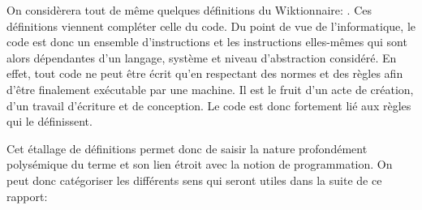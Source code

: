 \documentclass[12pt]{article} %
\begin{document}
On considèrera tout de même quelques définitions du Wiktionnaire:
\cite{noauthor_undated-vw}. Ces définitions viennent compléter celle du code. Du point de vue de l'informatique, le code est donc un ensemble d'instructions et les instructions elles-mêmes qui sont alors dépendantes d'un langage, système et niveau d'abstraction considéré. En effet, tout code ne peut être écrit qu'en respectant des normes et des règles afin d'être finalement exécutable par une machine. Il est le fruit d'un acte de création, d'un travail d'écriture et de conception. Le code est donc fortement lié aux règles qui le définissent. 

Cet étallage de définitions permet donc de saisir la nature profondément polysémique du terme et son lien étroit avec la notion de programmation. On peut donc catégoriser les différents sens qui seront utiles dans la suite de ce rapport:
\end{document}
